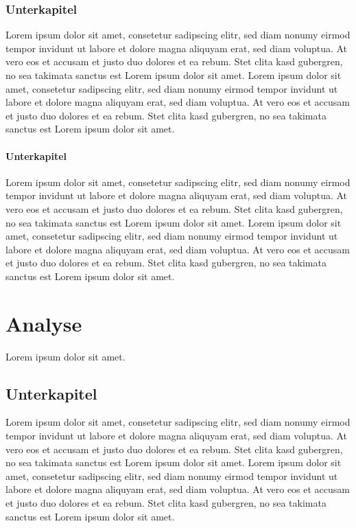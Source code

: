\documentclass{article}
\begin{document}
\subsection{Unterkapitel}
\label{subsec:uu1}
Lorem ipsum dolor sit amet, consetetur sadipscing elitr, sed diam nonumy eirmod tempor invidunt ut labore et dolore magna aliquyam erat, sed diam voluptua. At vero eos et accusam et justo duo dolores et ea rebum. Stet clita kasd gubergren, no sea takimata sanctus est Lorem ipsum dolor sit amet. Lorem ipsum dolor sit amet, consetetur sadipscing elitr, sed diam nonumy eirmod tempor invidunt ut labore et dolore magna aliquyam erat, sed diam voluptua. At vero eos et accusam et justo duo dolores et ea rebum. Stet clita kasd gubergren, no sea takimata sanctus est Lorem ipsum dolor sit amet.

\subsubsection{Unterkapitel}
\label{subsubsec:uuu1}
Lorem ipsum dolor sit amet, consetetur sadipscing elitr, sed diam nonumy eirmod tempor invidunt ut labore et dolore magna aliquyam erat, sed diam voluptua. At vero eos et accusam et justo duo dolores et ea rebum. Stet clita kasd gubergren, no sea takimata sanctus est Lorem ipsum dolor sit amet. Lorem ipsum dolor sit amet, consetetur sadipscing elitr, sed diam nonumy eirmod tempor invidunt ut labore et dolore magna aliquyam erat, sed diam voluptua. At vero eos et accusam et justo duo dolores et ea rebum. Stet clita kasd gubergren, no sea takimata sanctus est Lorem ipsum dolor sit amet.


\chapter{Analyse}
\label{chap:analyse}
Lorem ipsum dolor sit amet.

\section{Unterkapitel}
\label{sec:u4}
Lorem ipsum dolor sit amet, consetetur sadipscing elitr, sed diam nonumy eirmod tempor invidunt ut labore et dolore magna aliquyam erat, sed diam voluptua. At vero eos et accusam et justo duo dolores et ea rebum. Stet clita kasd gubergren, no sea takimata sanctus est Lorem ipsum dolor sit amet. Lorem ipsum dolor sit amet, consetetur sadipscing elitr, sed diam nonumy eirmod tempor invidunt ut labore et dolore magna aliquyam erat, sed diam voluptua. At vero eos et accusam et justo duo dolores et ea rebum. Stet clita kasd gubergren, no sea takimata sanctus est Lorem ipsum dolor sit amet.
\end{document}
